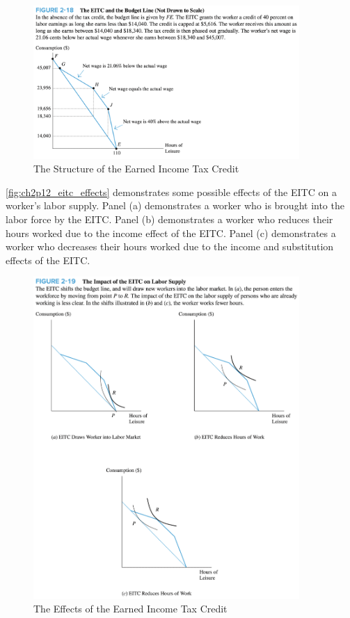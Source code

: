 \begin{figure}[!htb]
    \centering
        \includegraphics[width=0.9\textwidth]{../input/ch_2p12_eitc_structure.png}
    \caption{The Structure of the Earned Income Tax Credit}
    \label{fig:ch2p12_eitc_structure}
\end{figure}

\FloatBarrier

\autoref{fig:ch2p12_eitc_effects} demonstrates some possible 
effects of the EITC on a worker's labor supply. Panel (a)
demonstrates a worker who is brought into the labor force
by the EITC. Panel (b) demonstrates a worker who
reduces their hours worked due to the income effect of the EITC.
Panel (c) demonstrates a worker who decreases their hours worked 
due to the income and substitution effects of the EITC.


\FloatBarrier

\begin{figure}[!htb]
    \centering
        \includegraphics[width=0.9\textwidth]{../input/ch_2p12_eitc_effects.png}
    \caption{The Effects of the Earned Income Tax Credit}
    \label{fig:ch2p12_eitc_effects}
\end{figure}

